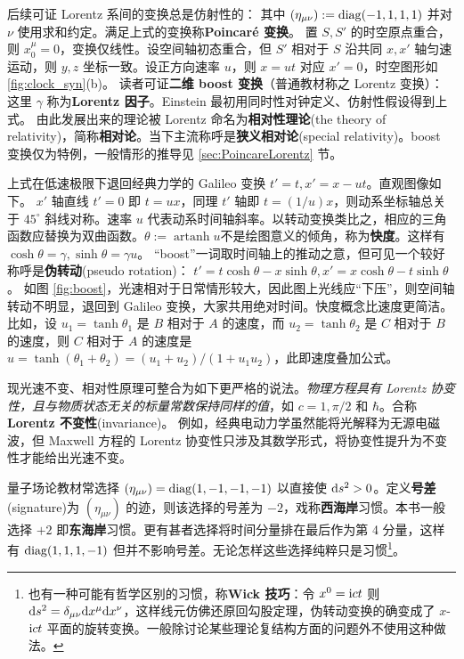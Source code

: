 后续可证 Lorentz 系间的变换总是仿射性的：
其中 $({\eta}_{\mu\nu}):=\operatorname{diag}(-1,1,1,1)$ 并对 $\nu$ 使用求和约定。满足上式的变换称\textbf{Poincaré 变换}。
置 $S,S'$ 的时空原点重合，则 $x^\mu_0=0$，变换仅线性。设空间轴初态重合，但 $S'$ 相对于 $S$ 沿共同 $x,x'$ 轴匀速运动，则 $y,z$ 坐标一致。设正方向速率 $u$，则 $x=ut$ 对应 $x'=0$，时空图形如 \ref{fig:clock_syn}(b)。    
读者可证\textbf{二维 boost 变换}（普通教材称之 Lorentz 变换）：
    这里 $\gamma$ 称为\textbf{Lorentz 因子}。Einstein 最初用同时性对钟定义、仿射性假设得到上式。
    由此发展出来的理论被 Lorentz 命名为\textbf{相对性理论}(the theory of relativity)，简称\textbf{相对论}。当下主流称呼是\textbf{狭义相对论}(special relativity)。boost 变换仅为特例，一般情形的推导见 \ref{sec:PoincareLorentz} 节。
    
    上式在低速极限下退回经典力学的 Galileo 变换 $t'=t,x'=x-ut$。直观图像如下。
    $x'$ 轴直线 $t'=0$ 即 $t=u x$，同理 $t'$ 轴即 $t=(1 / u) x$，则动系坐标轴总关于 $45^\circ$ 斜线对称。速率 $u$ 代表动系时间轴斜率。以转动变换类比之，相应的三角函数应替换为双曲函数。$\theta:=\operatorname{artanh}u$不是绘图意义的倾角，称为\textbf{快度}。这样有 $\cosh\theta=\gamma,  \sinh\theta=\gamma u$。
    “boost”一词取时间轴上的推动之意，但可见一个较好称呼是\textbf{伪转动}(pseudo rotation)：
    $t'= t\cosh\theta - x\sinh\theta, x'= x\cosh\theta -t \sinh\theta$。
    如图 \ref{fig:boost}，光速相对于日常情形较大，因此图上光线应“下压”，则空间轴转动不明显，退回到 Galileo 变换，大家共用绝对时间。快度概念比速度更简洁。比如，设 $u_1=\tanh\theta_{1}$ 是 $B$ 相对于 $A$ 的速度，而 $u_2=\tanh\theta_{2}$ 是 $C$ 相对于 $B$ 的速度，则 $C$ 相对于 $A$ 的速度是 $u=\tanh \left(\theta_1+\theta_{2}\right)={(u_{1}+u_{2})}/{(1+u_{1} u_{2})}$，此即速度叠加公式。

    现光速不变、相对性原理可整合为如下更严格的说法。\textit{物理方程具有 Lorentz 协变性，且与物质状态无关的标量常数保持同样的值}，如 $c=1,\pi/2$ 和 $\hbar$。合称\textbf{Lorentz 不变性}(invariance)。
例如，经典电动力学虽然能将光解释为无源电磁波，但 Maxwell 方程的 Lorentz 协变性只涉及其数学形式，将协变性提升为不变性才能给出光速不变。

    量子场论教材常选择 $(\eta_{\mu\nu})=\operatorname{diag}(1,-1,-1,-1)$ 以直接使 $\dd s^2>0$。定义\textbf{号差}(signature)为 $(\eta_{\mu\nu})$ 的迹，则该选择的号差为 $-2$，戏称\textbf{西海岸}习惯。本书一般选择 $+2$ 即\textbf{东海岸}习惯。更有甚者选择将时间分量排在最后作为第 4 分量，这样有 $\operatorname{diag}(1,1,1,-1)$ 但并不影响号差。无论怎样这些选择纯粹只是习惯\footnote{也有一种可能有哲学区别的习惯，称\textbf{Wick 技巧}：令 $x^0=\mathrm{i} ct$ 则 $\dd s^2= \delta_{\mu\nu}\dd x^\mu\dd x^\nu$，这样线元仿佛还原回勾股定理，伪转动变换的确变成了 $x$-$\mathrm{i} ct$ 平面的旋转变换。一般除讨论某些理论复结构方面的问题外不使用这种做法。}。

